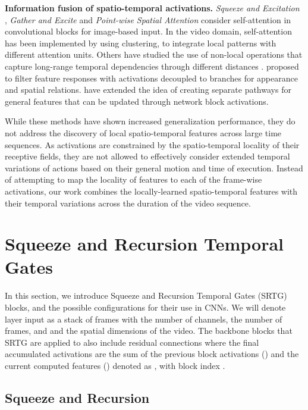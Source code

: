 \documentclass[final,5p,times,twocolumn]{elsarticle}
\begin{document}
\textbf{Information fusion of spatio-temporal activations.} \textit{Squeeze and Excitation} \citep{hu2018squeeze}, \textit{Gather and Excite} \citep{hu2018gather} and \textit{Point-wise Spatial Attention} \citep{zhao2018psanet} consider self-attention in convolutional blocks for image-based input. In the video domain, self-attention has been implemented by \citet{long2018attention} using clustering, to integrate local patterns with different attention units. Others have studied the use of non-local operations that capture long-range temporal dependencies through different distances \citep{wang2018non}. \citet{wang2018appearance} proposed to filter feature responses with activations decoupled to branches for appearance and spatial relations. \citet{qiu2019learning} have extended the idea of creating separate pathways for general features that can be updated through network block activations.

While these methods have shown increased generalization performance, they do not address the discovery of local spatio-temporal features across large time sequences. As activations are constrained by the spatio-temporal locality of their receptive fields, they are not allowed to effectively consider extended temporal variations of actions based on their general motion and time of execution. Instead of attempting to map the locality of features to each of the frame-wise activations, our work combines the locally-learned spatio-temporal features with their temporal variations across the duration of the video sequence.



\section{Squeeze and Recursion Temporal Gates}
\label{sec:methodology}

In this section, we introduce Squeeze and Recursion Temporal Gates (SRTG) blocks, and the possible configurations for their use in CNNs. We will denote layer input  as a stack of  frames  with  the number of channels,  the number of frames, and  and  the spatial dimensions of the video. The backbone blocks that SRTG are applied to also include residual connections where the final accumulated activations are the sum of the previous block activations () and the current computed features () denoted as , with block index .


\subsection{Squeeze and Recursion}
\label{sec:SR}
\end{document}
